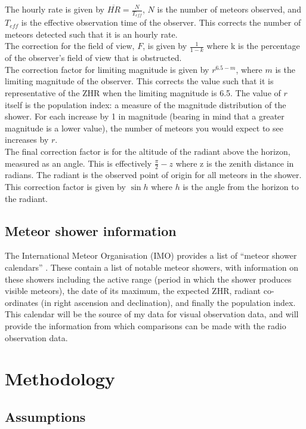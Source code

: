 The hourly rate is given by $\overline{HR} = \frac{N}{T_{eff}}$, $N$ is the
number of meteors observed, and $T_{eff}$ is the effective observation time of
the observer. This corrects the number of meteors detected such that it is an
hourly rate. \\ The correction for the field of view, $F$, is given by
$\frac{1}{1-k}$ where k is the percentage of the observer's field of view that
is obstructed. \\ The correction factor for limiting magnitude is given by
$r^{6.5-m}$, where $m$ is the limiting magnitude of the observer. This corrects
the value such that it is representative of the ZHR when the limiting magnitude
is 6.5.  The value of $r$ itself is the population index: a measure of the
magnitude distribution of the shower. For each increase by 1 in magnitude
(bearing in mind that a greater magnitude is a lower value), the number of
meteors you would expect to see increases by $r$.\\ The final correction factor
is for the altitude of the radiant above the horizon, measured as an angle.
This is effectively $\frac{\pi}{2}-z$ where z is the zenith distance in
radians. The radiant is the observed point of origin for all meteors in the
shower. This correction factor is given by $\sin h$ where $h$ is the angle from
the horizon to the radiant.\\

\subsection{Meteor shower information}

The International Meteor Organisation (IMO) provides a list of ``meteor shower
calendars'' \cite{imo_meteor_calendar}. These contain a list of notable meteor
showers, with information on these showers including the active range (period
in which the shower produces visible meteors), the date of its maximum, the
expected ZHR, radiant co-ordinates (in right ascension and declination), and
finally the population index. This calendar will be the source of my data for
visual observation data, and will provide the information from which
comparisons can be made with the radio observation data.

\section{Methodology}

\subsection{Assumptions}

